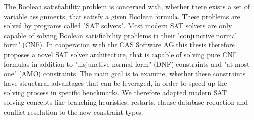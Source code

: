 
\Abstract

The Boolean satisfiability problem is concerned with, whether there exists a set of variable assignments, that satisfy a given Boolean formula. These problems are solved by programs called "SAT solvers". Most modern SAT solvers are only capable of solving Boolean satisfiability problems in their "conjunctive normal form" (CNF). In cooperation with the CAS Software AG this thesis therefore proposes a novel SAT solver architecture, that is capable of solving pure CNF formulas in addition to "disjunctive normal form" (DNF) constraints and "at most one" (AMO) constraints. The main goal is to examine, whether these constraints have structural advantages that can be leveraged, in order to speed up the solving process in specific benchmarks. We therefore adapted modern SAT solving concepts like branching heuristics, restarts, clause database reduction and conflict resolution to the new constraint types.